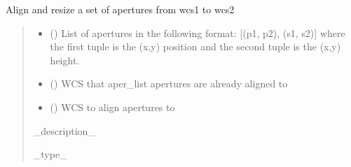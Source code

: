 \documentclass[letterpaper,10pt,english]{sphinxmanual}
\begin{document}
\label{\detokenize{modules:module-cubespa.spectra}}

\begin{fulllineitems}
\label{\detokenize{modules:cubespa.spectra.align_apertures}}
\pysigstartsignatures
{}
\pysigstopsignatures
\sphinxAtStartPar
Align and resize a set of apertures from wcs1 to wcs2
\begin{quote}\begin{description}
\begin{itemize}
\item {} 
\sphinxAtStartPar
{} () \textendash{} List of apertures in the following format:
{[}(p1, p2), (s1, s2){]} where the first tuple is the (x,y) position and the second tuple is the (x,y) height.

\item {} 
\sphinxAtStartPar
{} () \textendash{} WCS that aper\_list apertures are already aligned to

\item {} 
\sphinxAtStartPar
{} () \textendash{} WCS to align apertures to

\end{itemize}

\sphinxAtStartPar
\_description\_

\sphinxAtStartPar
\_type\_

\end{description}\end{quote}

\end{fulllineitems}

\end{document}

